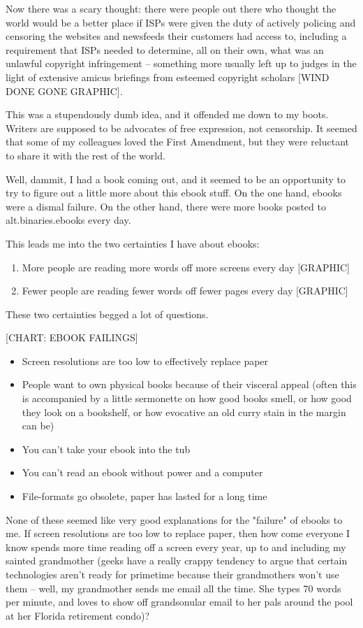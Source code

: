 Now there was a scary thought: there were people out there who
thought the world would be a better place if ISPs were given the
duty of actively policing and censoring the websites and newsfeeds
their customers had access to, including a requirement that ISPs
needed to determine, all on their own, what was an unlawful
copyright infringement -- something more usually left up to judges
in the light of extensive amicus briefings from esteemed copyright
scholars [WIND DONE GONE GRAPHIC].

This was a stupendously dumb idea, and it offended me down to my
boots. Writers are supposed to be advocates of free expression, not
censorship. It seemed that some of my colleagues loved the First
Amendment, but they were reluctant to share it with the rest of the
world.

Well, dammit, I had a book coming out, and it seemed to be an
opportunity to try to figure out a little more about this ebook
stuff. On the one hand, ebooks were a dismal failure. On the other
hand, there were more books posted to alt.binaries.ebooks every
day.

This leads me into the two certainties I have about ebooks:

\begin{enumerate}
\item
  More people are reading more words off more screens every day
  [GRAPHIC]
\item
  Fewer people are reading fewer words off fewer pages every day
  [GRAPHIC]
\end{enumerate}
These two certainties begged a lot of questions.

[CHART: EBOOK FAILINGS]

\begin{itemize}
\item
  Screen resolutions are too low to effectively replace paper
\item
  People want to own physical books because of their visceral appeal
  (often this is accompanied by a little sermonette on how good books
  smell, or how good they look on a bookshelf, or how evocative an
  old curry stain in the margin can be)
\item
  You can't take your ebook into the tub
\item
  You can't read an ebook without power and a computer
\item
  File-formats go obsolete, paper has lasted for a long time
\end{itemize}
None of these seemed like very good explanations for the "failure"
of ebooks to me. If screen resolutions are too low to replace
paper, then how come everyone I know spends more time reading off a
screen every year, up to and including my sainted grandmother
(geeks have a really crappy tendency to argue that certain
technologies aren't ready for primetime because their grandmothers
won't use them -- well, my grandmother sends me email all the time.
She types 70 words per minute, and loves to show off grandsonular
email to her pals around the pool at her Florida retirement
condo)?

